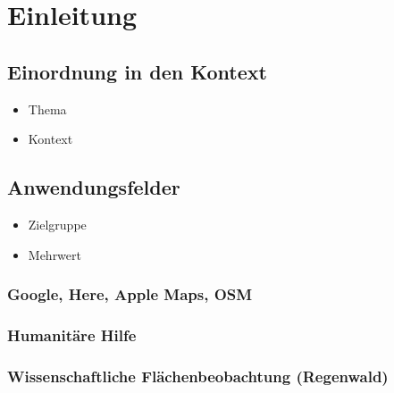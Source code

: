 \section{Einleitung}

\subsection{Einordnung in den Kontext}
\begin{itemize}
	\item Thema
	\item Kontext
\end{itemize}

\subsection{Anwendungsfelder}
\begin{itemize}
	\item Zielgruppe
	\item Mehrwert
\end{itemize}
\subsubsection{Google, Here, Apple Maps, OSM}
\subsubsection{Humanitäre Hilfe}
\subsubsection{Wissenschaftliche Flächenbeobachtung (Regenwald)}


